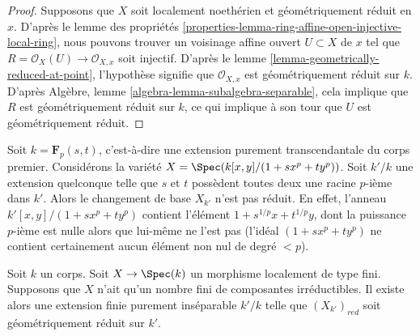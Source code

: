 \begin{proof}
Supposons que $X$ soit localement noethérien et
géométriquement réduit en $x$. D'après le lemme des
propriétés
\ref{properties-lemma-ring-affine-open-injective-local-ring}, nous
pouvons trouver un voisinage affine ouvert $U \subset X$ de $x$
tel que $R = \mathcal{O}_X(U) \to \mathcal{O}_{X, x}$ soit
injectif. D'après le lemme \ref{lemma-geometrically-reduced-at-point},
l'hypothèse signifie que $\mathcal{O}_{X, x}$ est géométriquement
réduit sur $k$. D'après Algèbre, lemme
\ref{algebra-lemma-subalgebra-separable}, cela implique que $R$ est
géométriquement réduit sur $k$, ce qui implique à son tour que $U$ est géométriquement réduit.
\end{proof}

\begin{example}
\label{example-not-geometrically-reduced}
Soit $k = \mathbf{F}_p(s, t)$, c'est-à-dire une
extension purement transcendantale du corps premier.
Considérons la variété $X = \Spec(k[x, y]/(1 + sx^p +
ty^p))$. Soit $k'/k$ une extension quelconque telle que $s$
et $t$ possèdent toutes deux une racine $p$-ième dans $k'$.
Alors le changement de base $X_{k'}$ n'est pas réduit. En
effet, l'anneau $k'[x, y]/(1 + s x^p + ty^p)$ contient
l'élément $1 + s^{1/p}x + t^{1/p}y$, dont la puissance $p$-ième est
nulle alors que lui-même ne l'est pas (l'idéal $(1 + sx^p + ty^p)$
ne contient certainement aucun élément non nul de degré $< p$).
\end{example}

\begin{lemma}
\label{lemma-finite-extension-geometrically-reduced}
Soit $k$ un corps. Soit $X \to \Spec(k)$ un morphisme
localement de type fini. Supposons que $X$ n'ait qu'un nombre
fini de composantes irréductibles. Il existe alors une
extension finie purement inséparable $k'/k$ telle que
$(X_{k'})_{red}$ soit géométriquement réduit sur $k'$.
\end{lemma}

